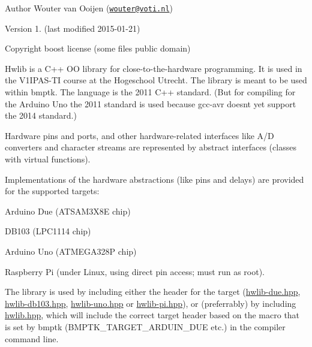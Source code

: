 

\begin{DoxyAuthor}{Author}
Wouter van Ooijen (\href{mailto:wouter@voti.nl}{\tt wouter@voti.\+nl}) 
\end{DoxyAuthor}
\begin{DoxyVersion}{Version}
1. (last modified 2015-\/01-\/21) 
\end{DoxyVersion}
\begin{DoxyCopyright}{Copyright}
boost license (some files public domain)
\end{DoxyCopyright}
Hwlib is a C++ OO library for close-\/to-\/the-\/hardware programming. It is used in the V1\+I\+P\+A\+S-\/\+TI course at the Hogeschool Utrecht. The library is meant to be used within bmptk. The language is the 2011 C++ standard. (But for compiling for the Arduino Uno the 2011 standard is used because gcc-\/avr doesn\textquotesingle{}t yet support the 2014 standard.)

Hardware pins and ports, and other hardware-\/related interfaces like A/D converters and character streams are represented by abstract interfaces (classes with virtual functions).

Implementations of the hardware abstractions (like pins and delays) are provided for the supported targets\+:
\begin{DoxyItemize}
\item Arduino Due (A\+T\+S\+A\+M3\+X8E chip)
\item D\+B103 (L\+P\+C1114 chip)
\item Arduino Uno (A\+T\+M\+E\+G\+A328P chip)
\item Raspberry Pi (under Linux, using direct pin access; must run as root).
\end{DoxyItemize}

The library is used by including either the header for the target (\hyperlink{hwlib-due_8hpp}{hwlib-\/due.\+hpp}, \hyperlink{hwlib-db103_8hpp}{hwlib-\/db103.\+hpp}, \hyperlink{hwlib-uno_8hpp}{hwlib-\/uno.\+hpp} or \hyperlink{hwlib-pi_8hpp_source}{hwlib-\/pi.\+hpp}), or (preferrably) by including \hyperlink{hwlib_8hpp_source}{hwlib.\+hpp}, which will include the correct target header based on the macro that is set by bmptk (B\+M\+P\+T\+K\+\_\+\+T\+A\+R\+G\+E\+T\+\_\+\+A\+R\+D\+U\+I\+N\+\_\+\+D\+UE etc.) in the compiler command line.


